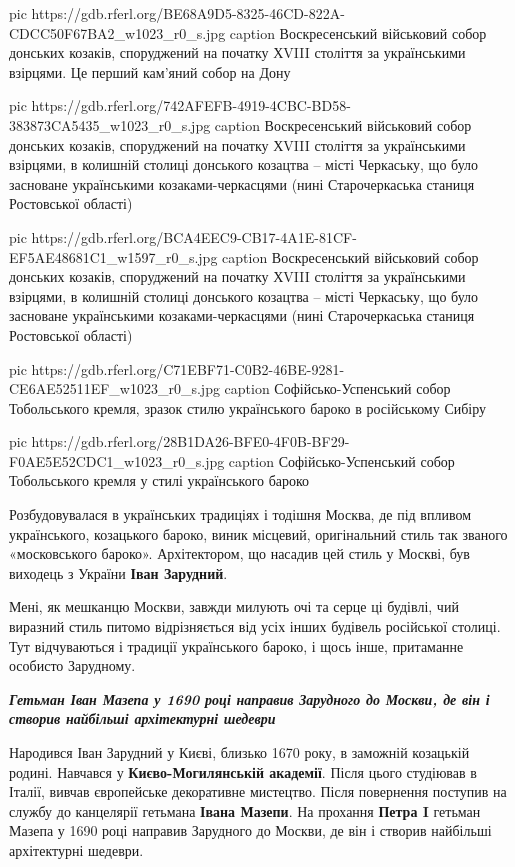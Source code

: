 \ifcmt
pic https://gdb.rferl.org/BE68A9D5-8325-46CD-822A-CDCC50F67BA2_w1023_r0_s.jpg
caption Воскресенський військовий собор донських козаків, споруджений на початку ХVIII століття за українськими взірцями. Це перший кам’яний собор на Дону

pic https://gdb.rferl.org/742AFEFB-4919-4CBC-BD58-383873CA5435_w1023_r0_s.jpg
caption Воскресенський військовий собор донських козаків, споруджений на початку ХVIII століття за українськими взірцями, в колишній столиці донського козацтва – місті Черкаську, що було засноване українськими козаками-черкасцями (нині Старочеркаська станиця Ростовської області)

pic https://gdb.rferl.org/BCA4EEC9-CB17-4A1E-81CF-EF5AE48681C1_w1597_r0_s.jpg
caption Воскресенський військовий собор донських козаків, споруджений на початку ХVIII століття за українськими взірцями, в колишній столиці донського козацтва – місті Черкаську, що було засноване українськими козаками-черкасцями (нині Старочеркаська станиця Ростовської області)

pic https://gdb.rferl.org/C71EBF71-C0B2-46BE-9281-CE6AE52511EF_w1023_r0_s.jpg
caption Софійсько-Успенський собор Тобольського кремля, зразок стилю українського бароко в російському Сибіру

pic https://gdb.rferl.org/28B1DA26-BFE0-4F0B-BF29-F0AE5E52CDC1_w1023_r0_s.jpg
caption Софійсько-Успенський собор Тобольського кремля у стилі українського бароко
\fi

Розбудовувалася в українських традиціях і тодішня Москва, де під впливом
українського, козацького бароко, виник місцевий, оригінальний стиль так званого
«московського бароко». Архітектором, що насадив цей стиль у Москві, був
виходець з України \textbf{Іван Зарудний}.

Мені, як мешканцю Москви, завжди милують очі та серце ці будівлі, чий виразний
стиль питомо відрізняється від усіх інших будівель російської столиці. Тут
відчуваються і традиції українського бароко, і щось інше, притаманне особисто
Зарудному.

\begin{leftbar}
	\begingroup
		\em\large\color{orange}\bfseries 
Гетьман Іван Мазепа у 1690 році направив Зарудного до Москви, де він і створив найбільші архітектурні шедеври
	\endgroup
\end{leftbar}

Народився Іван Зарудний у Києві, близько 1670 року, в заможній козацькій
родині. Навчався у \textbf{Києво-Могилянській академії}. Після цього студіював в Італії,
вивчав європейське декоративне мистецтво. Після повернення поступив на службу
до канцелярії гетьмана \textbf{Івана Мазепи}. На прохання \textbf{Петра I} гетьман Мазепа у 1690
році направив Зарудного до Москви, де він і створив найбільші архітектурні
шедеври.

